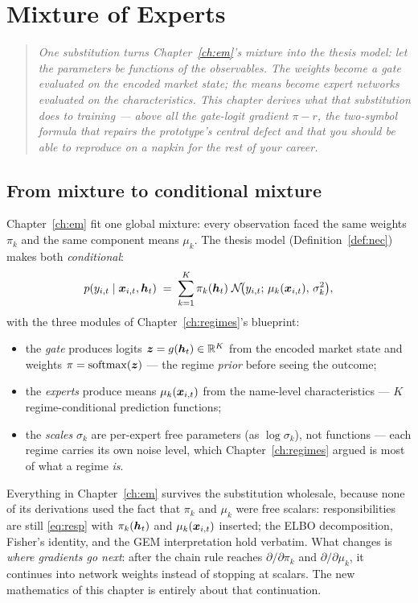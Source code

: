 \chapter{Mixture of Experts}\label{ch:moe}

\begin{quote}\itshape
One substitution turns Chapter~\ref{ch:em}'s mixture into the thesis
model: let the parameters be functions of the observables. The weights
become a gate evaluated on the encoded market state; the means become
expert networks evaluated on the characteristics. This chapter derives
what that substitution does to training --- above all the gate-logit
gradient $\pi - r$, the two-symbol formula that repairs the prototype's
central defect and that you should be able to reproduce on a napkin for
the rest of your career.
\end{quote}

\section{From mixture to conditional mixture}\label{sec:conditionalmoe}

Chapter~\ref{ch:em} fit one global mixture: every observation faced the
same weights $\pi_k$ and the same component means $\mu_k$. The thesis
model (Definition~\ref{def:nec}) makes both \emph{conditional}:
\begin{equation}\label{eq:moedensity}
  p(y_{i,t} \mid \bm{x}_{i,t}, \bm{h}_t)
  \;=\; \sum_{k=1}^{K} \pi_k(\bm{h}_t)\;
  \mathcal{N}\!\bigl(y_{i,t};\, \mu_k(\bm{x}_{i,t}),\, \sigma_k^2\bigr),
\end{equation}
with the three modules of Chapter~\ref{ch:regimes}'s blueprint:
\begin{itemize}[leftmargin=1.6em, itemsep=1pt]
\item the \emph{gate} produces logits $\bm{z} = g(\bm{h}_t) \in \mathbb{R}^K$ from the
  encoded market state and weights $\pi = \operatorname{softmax}(\bm{z})$
  --- the regime \emph{prior} before seeing the outcome;
\item the \emph{experts} produce means $\mu_k(\bm{x}_{i,t})$ from the
  name-level characteristics --- $K$ regime-conditional prediction
  functions;
\item the \emph{scales} $\sigma_k$ are per-expert free parameters
  (as $\log\sigma_k$), not functions --- each regime carries its own
  noise level, which Chapter~\ref{ch:regimes} argued is most of what a
  regime \emph{is}.
\end{itemize}
Everything in Chapter~\ref{ch:em} survives the substitution wholesale,
because none of its derivations used the fact that $\pi_k$ and $\mu_k$
were free scalars: responsibilities are still \eqref{eq:resp} with
$\pi_k(\bm{h}_t)$ and $\mu_k(\bm{x}_{i,t})$ inserted; the ELBO decomposition,
Fisher's identity, and the GEM interpretation hold verbatim. What changes
is \emph{where gradients go next}: after the chain rule reaches
$\partial/\partial \pi_k$ and $\partial/\partial \mu_k$, it continues into
network weights instead of stopping at scalars. The new mathematics of
this chapter is entirely about that continuation.

